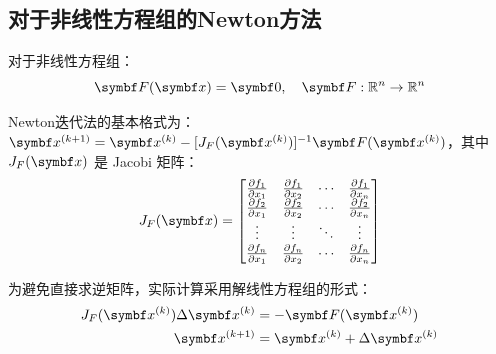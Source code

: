 \subsection{对于非线性方程组的Newton方法}
对于非线性方程组：
\[
\vvec{F}(\vvec{x}) = \vvec{0}, \quad \vvec{F}: \mathbb{R}^n \to \mathbb{R}^n
\]

Newton迭代法的基本格式为：
\(
\vvec{x}^{(k+1)} = \vvec{x}^{(k)} - [J_F(\vvec{x}^{(k)})]^{-1} \vvec{F}(\vvec{x}^{(k)})
\)，其中 $J_F(\vvec{x})$ 是 Jacobi 矩阵：
\[
J_F(\vvec{x}) = \begin{bmatrix}
\frac{\partial f_1}{\partial x_1} & \frac{\partial f_1}{\partial x_2} & \cdots & \frac{\partial f_1}{\partial x_n} \\
\frac{\partial f_2}{\partial x_1} & \frac{\partial f_2}{\partial x_2} & \cdots & \frac{\partial f_2}{\partial x_n} \\
\vdots & \vdots & \ddots & \vdots \\
\frac{\partial f_n}{\partial x_1} & \frac{\partial f_n}{\partial x_2} & \cdots & \frac{\partial f_n}{\partial x_n}
\end{bmatrix}
\]

为避免直接求逆矩阵，实际计算采用解线性方程组的形式：
\begin{align*}
J_F(\vvec{x}^{(k)}) \Delta \vvec{x}^{(k)} &= -\vvec{F}(\vvec{x}^{(k)}) \\
\vvec{x}^{(k+1)} &= \vvec{x}^{(k)} + \Delta \vvec{x}^{(k)}
\end{align*}

